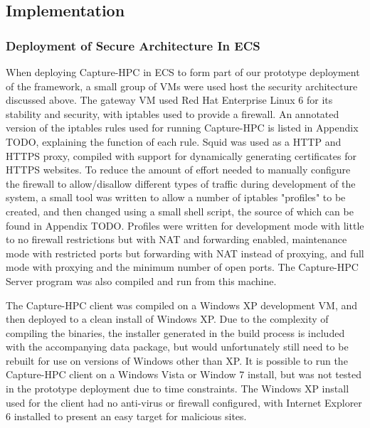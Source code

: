 \subsection{Implementation}

\subsubsection{Deployment of Secure Architecture In ECS}


When deploying Capture-HPC in ECS to form part of our prototype deployment of
the framework, a small group of VMs were used host the security architecture
discussed above. The gateway VM used Red Hat Enterprise Linux 6 for its
stability and security,
with iptables used to provide a firewall. An annotated version of the iptables
rules used for running Capture-HPC is listed in Appendix TODO, explaining the
function of each rule. Squid was used as a HTTP and HTTPS proxy, compiled with
support for dynamically generating certificates for HTTPS websites. To reduce
the amount of effort needed to manually configure the firewall to allow/disallow
different types of traffic during
development of the system, a small tool was written to allow a number of
iptables "profiles" to be created, and then changed using a small shell script,
the source of which can be found in Appendix TODO. Profiles were written for
development mode with little to no firewall restrictions but with NAT and
forwarding enabled, maintenance mode with restricted ports but forwarding with
NAT instead of proxying, and full mode with proxying and the minimum number of
open ports. The Capture-HPC Server program was also compiled and run from this machine.

The Capture-HPC client was compiled on a Windows XP development VM, and then
deployed to a clean install of Windows XP. Due to the complexity of compiling
the binaries, the installer generated in the build process is included with the
accompanying data package, but would unfortunately still need to be rebuilt for
use on versions of Windows other than XP. It is possible to run the
Capture-HPC client on a Windows Vista or Window 7 install, but was not tested in
the prototype deployment due to time constraints. The Windows XP install used
for the client had no anti-virus or firewall configured, with Internet Explorer
6 installed to present an easy target for malicious sites.

